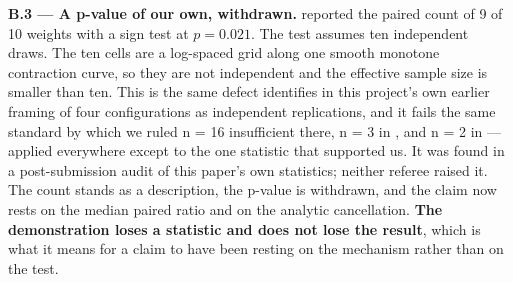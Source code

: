 \textbf{B.3 --- A p-value of our own, withdrawn.}  reported the paired count of 9 of 10 weights
with a sign test at \(p = 0.021\). The test assumes ten independent draws. The ten cells are a
log-spaced grid along one smooth monotone contraction curve, so they are not independent and
the effective sample size is smaller than ten. This is the same defect  identifies in this
project's own earlier framing of four configurations as independent replications, and it fails
the same standard by which we ruled n = 16 insufficient there, n = 3 in , and n = 2 in
 --- applied everywhere except to the one statistic that supported us. It was found in
a post-submission audit of this paper's own statistics; neither referee raised it. The count
stands as a description, the p-value is withdrawn, and the claim now rests on the median paired
ratio and on the analytic cancellation. \textbf{The demonstration loses a statistic and does not lose
the result}, which is what it means for a claim to have been resting on the mechanism rather
than on the test.
